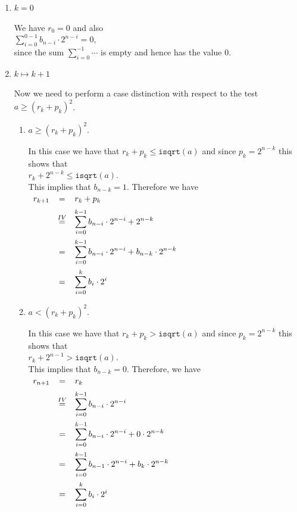 \begin{enumerate}
\item[B.C.:] $k = 0$

  We have $r_0 = 0$ and also
  \\[0.2cm]
  \hspace*{1.3cm}
  $\sum\limits_{i=0}^{0-1} b_{n-i} \cdot 2^{n-i} = 0$,
  \\[0.2cm]
  since the sum $\sum\limits_{i=0}^{-1} \cdots$ is empty and hence has the value $0$.
\item[I.S.:] $k \mapsto k+1$

  Now we need to perform a case distinction with respect to the test $a \geq (r_k + p_k)^2$.
  \begin{enumerate}
  \item $a \geq (r_k + p_k)^2$.

    In this case we have that $r_k + p_k \leq \mathtt{isqrt}(a)$ and since $p_k = 2^{n-k}$ this shows that
    \\[0.2cm]
    \hspace*{1.3cm}
    $r_k + 2^{n-k} \leq \mathtt{isqrt}(a)$.
    \\[0.2cm]
    This implies that $b_{n-k} = 1$.  Therefore we have
    \\[0.2cm]
    \hspace*{1.3cm}
    $
    \begin{array}[t]{lcl}
      r_{k+1} & = & r_k + p_k \\[0.2cm] 
              & \stackrel{IV}{=} & \displaystyle\sum\limits_{i=0}^{k-1} b_{n-i} \cdot 2^{n-i} + 2^{n-k} \\[0.5cm]
              & = & \displaystyle\sum\limits_{i=0}^{k-1} b_{n-i} \cdot 2^{n-i} + b_{n-k} \cdot 2^{n-k} \\[0.5cm]
              & = & \displaystyle\sum\limits_{i=0}^{k} b_i \cdot 2^i 
    \end{array}
    $
  \item $a < (r_k + p_k)^2$. 

    In this case we have that $r_k + p_k > \mathtt{isqrt}(a)$ and since $p_k = 2^{n-k}$ this shows that
    \\[0.2cm]
    \hspace*{1.3cm}
    $r_k + 2^{n-1} > \mathtt{isqrt}(a)$.
    \\[0.2cm]
    This implies that $b_{n-k} = 0$.  Therefore, we have
    \\[0.2cm]
    \hspace*{1.3cm}
    $
    \begin{array}[t]{lcl}
      r_{n+1} & = & r_k  \\[0.2cm] 
              & \stackrel{IV}{=} & \displaystyle\sum\limits_{i=0}^{k-1} b_{n-i} \cdot 2^{n-i} \\[0.5cm]
              & = & \displaystyle\sum\limits_{i=0}^{k-1} b_{n-i} \cdot 2^{n-i} + 0 \cdot 2^{n-k} \\[0.5cm]
              & = & \displaystyle\sum\limits_{i=0}^{k-1} b_{n-1} \cdot 2^{n-i} + b_{k} \cdot 2^{n-k} \\[0.5cm]
              & = & \displaystyle\sum\limits_{i=0}^{k} b_i \cdot 2^i 
    \end{array}
    $
  \end{enumerate}
\end{enumerate}
